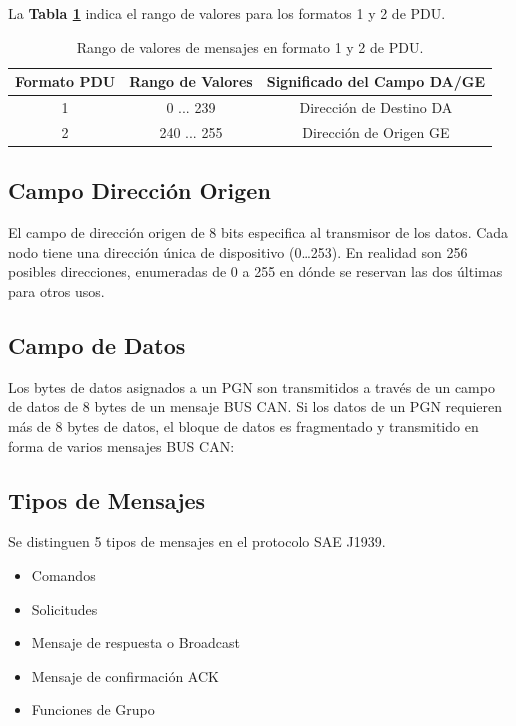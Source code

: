 La \textbf{Tabla \ref{rango}} indica el rango de valores para los formatos 1 y 2 de PDU.
\begin{table}[htb]
\begin{center}
\begin{tabular}{c c c}
\toprule
Formato PDU & Rango de Valores & Significado del Campo DA/GE \\
\midrule
1 &   0 ... 239 & Dirección de Destino DA\\ %
2 & 240 ... 255 & Dirección de Origen GE\\ %
\bottomrule
\end{tabular}
\caption{Rango de valores de mensajes en formato 1 y 2 de PDU.}
\label{rango}
\end{center}
\end{table}


\subsection{Campo Dirección Origen}

El campo de dirección origen de 8 bits especifica al transmisor de los datos. Cada nodo tiene una dirección única de dispositivo (0…253). En realidad son 256 posibles direcciones, enumeradas de 0 a 255 en dónde se reservan las dos últimas para otros usos.

\subsection{Campo de Datos}
Los bytes de datos asignados a un PGN son transmitidos a través de un campo de datos de 8 bytes de un mensaje BUS CAN. Si los datos de un PGN requieren más de 8 bytes de datos, el bloque de datos es fragmentado y transmitido en forma de varios mensajes BUS CAN:

\subsection{Tipos de Mensajes}
Se distinguen 5 tipos de mensajes en el protocolo SAE J1939.
\begin{itemize}
\item Comandos
\item Solicitudes
\item Mensaje de respuesta o Broadcast
\item Mensaje de confirmación  ACK
\item Funciones de Grupo
\end{itemize}

